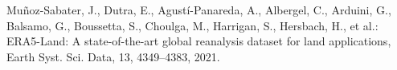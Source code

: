 \begin{thebibliography}{}
Mu{\~n}oz-Sabater, J., Dutra, E., Agust{\'i}-Panareda, A., Albergel, C.,
Arduini, G., Balsamo, G., Boussetta, S., Choulga, M., Harrigan, S., Hersbach,
H., et al.: ERA5-Land: A state-of-the-art global reanalysis dataset for land
applications, Earth Syst. Sci. Data, 13, 4349--4383, 2021.


\end{thebibliography}
